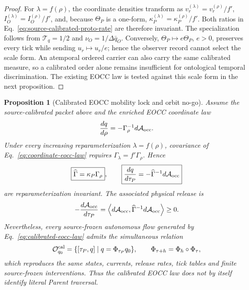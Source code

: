 \documentclass[11pt]{article}
\newtheorem{proposition}{Proposition}
\begin{document}
\begin{proof}
For \(\lambda=f(\rho)\), the coordinate densities transform as
\(v_r^{(\lambda)}=v_r^{(\rho)}/f'\),
\(I_O^{(\lambda)}=I_O^{(\rho)}/f'\), and, because \(\Theta_P\) is a one-form,
\(\kappa_P^{(\lambda)}=\kappa_P^{(\rho)}/f'\).  Both ratios in
Eq.~\eqref{eq:source-calibrated-proto-rate} are therefore invariant.  The
specialization follows from \(\mathcal T_q=1/2\) and
\(\nu_O=1/\Delta\bar q_O\).  Conversely,
\(\Theta_P\mapsto e\Theta_P\), \(e>0\), preserves every tick while sending
\(u_r\mapsto u_r/e\); hence the observer record cannot select the scale form.
An atemporal ordered carrier can also carry the same calibrated measure, so a
calibrated order alone remains insufficient for ontological temporal
discrimination.  The existing EOCC law is tested against this scale form in
the next proposition.
\end{proof}

\begin{proposition}[Calibrated EOCC mobility lock and orbit no-go]
Assume the source-calibrated packet above and the enriched EOCC coordinate
law
\begin{equation}
 \frac{dq}{d\rho}=-\Gamma_\rho^{-1}d\mathcal A_{\rm occ}.
 \label{eq:coordinate-eocc-law}
\end{equation}
Under every increasing reparameterization \(\lambda=f(\rho)\), covariance of
Eq.~\eqref{eq:coordinate-eocc-law} requires
\(\Gamma_\lambda=f'\Gamma_\rho\).  Hence
\begin{equation}
 \boxed{\widehat\Gamma=\kappa_P\Gamma_\rho},
 \qquad
 \boxed{\frac{dq}{d\tau_P}
 =-\widehat\Gamma^{-1}d\mathcal A_{\rm occ}}
 \label{eq:calibrated-eocc-law}
\end{equation}
are reparameterization invariant.  The associated physical release is
\begin{equation}
 -\frac{d\mathcal A_{\rm occ}}{d\tau_P}
 =\left\langle d\mathcal A_{\rm occ},
 \widehat\Gamma^{-1}d\mathcal A_{\rm occ}\right\rangle\geq0.
 \label{eq:calibrated-eocc-release}
\end{equation}
Nevertheless, every source-frozen autonomous flow generated by
Eq.~\eqref{eq:calibrated-eocc-law} admits the simultaneous relation
\begin{equation}
 \mathcal O_{q_0}^{\rm cal}
 =\{[\tau_P,q]\mid q=\Phi_{\tau_P}q_0\},
 \qquad \Phi_{\tau+h}=\Phi_h\circ\Phi_\tau,
 \label{eq:calibrated-eocc-orbit}
\end{equation}
which reproduces the same states, currents, release rates, tick tables and
finite source-frozen interventions.  Thus the calibrated EOCC law does not by
itself identify literal Parent traversal.
\end{proposition}
\end{document}
